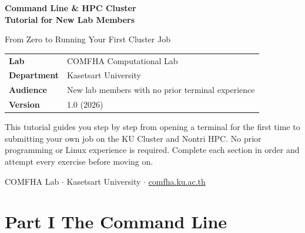 \documentclass[12pt,a4paper]{article}
\begin{document}
\begin{titlepage}
  \centering
  \vspace*{2cm}

  {\huge\bfseries\color{kugreen}
    Command Line \& HPC Cluster\\[0.4em]
    Tutorial for New Lab Members}

  \vspace{1.5cm}

  {\large\color{gray} From Zero to Running Your First Cluster Job}

  \vspace{2.5cm}

  \begin{tabular}{ll}
    \textbf{Lab}        & COMFHA Computational Lab \\[4pt]
    \textbf{Department} & Kasetsart University \\[4pt]
    \textbf{Audience}   & New lab members with no prior terminal experience \\[4pt]
    \textbf{Version}    & 1.0 (2026)
  \end{tabular}

  \vspace{2.5cm}

  \begin{tcolorbox}[enhanced, colback=kugreen!8, colframe=kugreen,
      left=12pt, right=12pt, top=8pt, bottom=8pt]
    \small
    This tutorial guides you step by step from opening a terminal for the
    first time to submitting your own job on the KU Cluster and Nontri HPC.
    No prior programming or Linux experience is required.
    Complete each section in order and attempt every exercise before moving on.
  \end{tcolorbox}

  \vfill
  {\small\color{gray} COMFHA Lab $\cdot$ Kasetsart University $\cdot$
   \url{comfha.ku.ac.th}}
\end{titlepage}

\tableofcontents
\clearpage

\part*{Part I \quad The Command Line}
\end{document}
